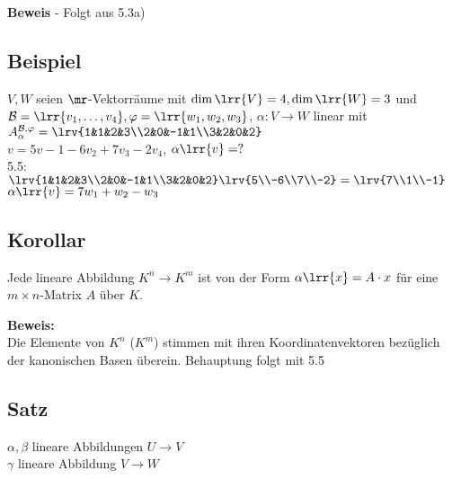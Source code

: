 
	\textbf{Beweis} - Folgt aus 5.3a)

\subsection{Beispiel}
	$V,W$ seien $\mr$-Vektorräume mit $\dim\lrr{V}=4, \dim\lrr{W}=3$ und $\mathcal{B}=\lrr{v_1,\dots,v_4},\varphi=\lrr{w_1,w_2,w_3}$, $\alpha:V\rightarrow W$ linear mit \\
	$A_\alpha^{\mathcal{B},\varphi}=\lrv{1&1&2&3\\2&0&-1&1\\3&2&0&2}$\\
	$v=5v-1-6v_2+7v_3-2v_4$, $\alpha\lrr{v}=?$\\
	5.5:$\lrv{1&1&2&3\\2&0&-1&1\\3&2&0&2}\lrv{5\\-6\\7\\-2}=\lrv{7\\1\\-1}$\\
	$\alpha\lrr{v}=7w_1+w_2-w_3$
	
\subsection{Korollar}
	Jede lineare Abbildung $K^n\rightarrow K^m$ ist von der Form $\alpha\lrr{x}=A\cdot x$ für eine $m\times n$-Matrix $A$ über $K$.

  \textbf{Beweis:}\\
Die Elemente von $K^n$ ($K^m$) stimmen mit ihren Koordinatenvektoren bezüglich der kanonischen Basen überein. Behauptung folgt mit 5.5

\subsection{Satz}
$\alpha,\beta$ lineare Abbildungen $U\rightarrow V$\\
$\gamma$ lineare Abbildung $V\rightarrow W$

